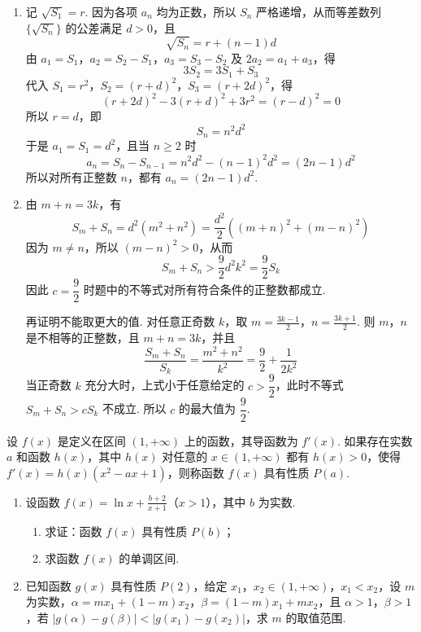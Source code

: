 \begin{solution}
\begin{enumerate}
\item 记 \(\sqrt{S_1}=r\). 因为各项 \(a_n\) 均为正数，所以 \(S_n\) 严格递增，从而等差数列 \(\{\sqrt{S_n}\}\) 的公差满足 \(d>0\)，且
\[
\sqrt{S_n}=r+(n-1)d
\]
由 \(a_1=S_1\)，\(a_2=S_2-S_1\)，\(a_3=S_3-S_2\) 及 \(2a_2=a_1+a_3\)，得
\[
3S_2=3S_1+S_3
\]
代入 \(S_1=r^2\)，\(S_2=(r+d)^2\)，\(S_3=(r+2d)^2\)，得
\[
(r+2d)^2-3(r+d)^2+3r^2=(r-d)^2=0
\]
所以 \(r=d\)，即
\[
S_n=n^2d^2
\]
于是 \(a_1=S_1=d^2\)，且当 \(n\geqslant2\) 时
\[
a_n=S_n-S_{n-1}=n^2d^2-(n-1)^2d^2=(2n-1)d^2
\]
所以对所有正整数 \(n\)，都有 \(a_n=(2n-1)d^2\).

\item 由 \(m+n=3k\)，有
\[
S_m+S_n=d^2(m^2+n^2)=\frac{d^2}{2}\left((m+n)^2+(m-n)^2\right)
\]
因为 \(m\neq n\)，所以 \((m-n)^2>0\)，从而
\[
S_m+S_n>\frac{9}{2}d^2k^2=\frac{9}{2}S_k
\]
因此 \(c=\dfrac{9}{2}\) 时题中的不等式对所有符合条件的正整数都成立.

再证明不能取更大的值. 对任意正奇数 \(k\)，取 \(m=\frac{3k-1}{2}\)，\(n=\frac{3k+1}{2}\).
则 \(m\)，\(n\) 是不相等的正整数，且 \(m+n=3k\)，并且
\[
\frac{S_m+S_n}{S_k}
=\frac{m^2+n^2}{k^2}
=\frac{9}{2}+\frac{1}{2k^2}
\]
当正奇数 \(k\) 充分大时，上式小于任意给定的 \(c>\dfrac{9}{2}\)，此时不等式 \(S_m+S_n>cS_k\) 不成立. 所以 \(c\) 的最大值为 \(\dfrac{9}{2}\).
\end{enumerate}
\end{solution}

\begin{problem}
设 \(f(x)\) 是定义在区间 \((1,+\infty)\) 上的函数，其导函数为 \(f'(x)\). 如果存在实数 \(a\) 和函数 \(h(x)\)，其中 \(h(x)\) 对任意的 \(x\in(1,+\infty)\) 都有 \(h(x)>0\)，使得 \(f'(x)=h(x)\left(x^2-ax+1\right)\)，则称函数 \(f(x)\) 具有性质 \(P(a)\).

\begin{enumerate}
\item 设函数 \(f(x)=\ln x+\frac{b+2}{x+1}\)（\(x>1\)），其中 \(b\) 为实数.
\begin{enumerate}
\item 求证：函数 \(f(x)\) 具有性质 \(P(b)\)；
\item 求函数 \(f(x)\) 的单调区间.
\end{enumerate}
\item 已知函数 \(g(x)\) 具有性质 \(P(2)\)，给定 \(x_1\)，\(x_2\in(1,+\infty)\)，\(x_1<x_2\)，设 \(m\) 为实数，\(\alpha=mx_1+(1-m)x_2\)，\(\beta=(1-m)x_1+mx_2\)，且 \(\alpha>1\)，\(\beta>1\)，若 \(|g(\alpha)-g(\beta)|<|g(x_1)-g(x_2)|\)，求 \(m\) 的取值范围.
\end{enumerate}
\end{problem}


